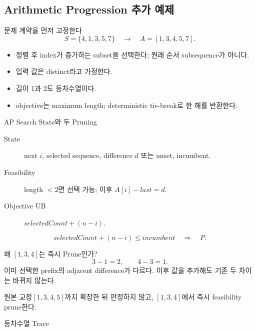 \subsection{Arithmetic Progression 추가 예제}
\begin{frame}{문제 계약을 먼저 고정한다 \hfill \ssoptional[선택 심화]}
\[
S=\{4,1,3,5,7\}\quad\to\quad A=[1,3,4,5,7].
\]
\begin{itemize}
\item 정렬 후 index가 증가하는 subset을 선택한다; 원래 순서 subsequence가 아니다.
\item 입력 값은 distinct라고 가정한다.
\item 길이 1과 2도 등차수열이다.
\item objective는 maximum length; deterministic tie-break로 한 해를 반환한다.
\end{itemize}
\end{frame}
\begin{frame}{AP Search State와 두 Pruning}
\begin{description}
\item[State] next \(i\), selected sequence, difference \(d\) 또는 unset, incumbent.
\item[Feasibility] length \(<2\)면 선택 가능; 이후 \(A[i]-last=d\).
\item[Objective UB] \(selectedCount+(n-i)\).
\end{description}
\[
selectedCount+(n-i)\le incumbent\quad\Longrightarrow\quad P.
\]
\end{frame}
\begin{frame}{왜 \([1,3,4]\)는 즉시 Prune인가?}
\[
3-1=2,\qquad 4-3=1.
\]
이미 선택한 prefix의 adjacent difference가 다르다. 이후 값을 추가해도 기존 두 차이는 바뀌지 않는다.
\begin{alertblock}{원본 교정}\([1,3,4,5]\)까지 확장한 뒤 판정하지 않고, \([1,3,4]\)에서 즉시 feasibility prune한다.\end{alertblock}
\end{frame}
\begin{frame}{등차수열 Trace}
\centering{}
\end{frame}

